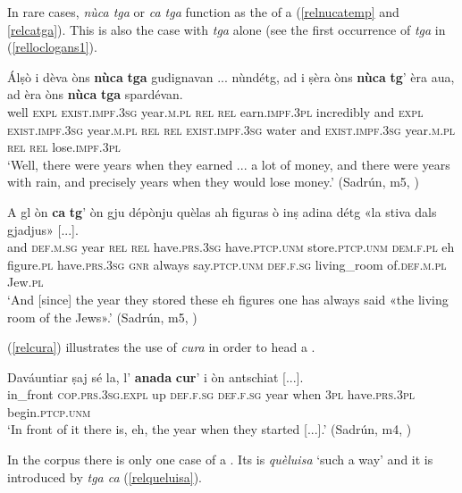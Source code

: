 In rare cases, \textit{nùca tga} or \textit{ca tga} function as the  of a  (\ref{relnucatemp} and \ref{relcatga}). This is also the case with \textit{tga} alone (see the first occurrence of \textit{tga} in (\ref{relloclogans1}).

\ea
\label{relnucatemp}
\gll Álṣò i dèva òns \textbf{nùca} \textbf{tga} gudignavan ... nùndétg, ad i ṣèra òns \textbf{nùca} \textbf{tg}’ èra aua, ad èra òns \textbf{nùca} \textbf{tga} spardévan.\\
well \textsc{expl} \textsc{exist.impf.3sg} year.\textsc{m.pl} \textsc{rel} \textsc{rel} earn.\textsc{impf.3pl} {} incredibly and \textsc{expl} \textsc{exist.impf.3sg} year.\textsc{m.pl} \textsc{rel} \textsc{rel} \textsc{exist.impf.3sg} water and \textsc{exist.impf.3sg} year.\textsc{m.pl} \textsc{rel} \textsc{rel} lose.\textsc{impf.3pl} \\
\glt `Well, there were years when they earned ... a lot of money, and there were years with rain, and precisely years when they would lose money.' (Sadrún, m5, )
\z

\ea
\label{relcatga}
\gll A gl òn \textbf{ca} \textbf{tg}’ òn gju dépònju quèlas ah figuras ò inṣ adina détg «la stiva dals gjadjus» [...].\\
and \textsc{def.m.sg} year \textsc{rel} \textsc{rel} have.\textsc{prs.3sg} have.\textsc{ptcp.unm} store.\textsc{ptcp.unm} \textsc{dem.f.pl} eh figure.\textsc{pl} have.\textsc{prs.3sg} \textsc{gnr} always say.\textsc{ptcp.unm} \textsc{def.f.sg} living\_room of.\textsc{def.m.pl} Jew.\textsc{pl}\\
\glt `And [since] the year they stored these eh figures one has always said «the living room of the Jews».' (Sadrún, m5, )
\z

(\ref{relcura}) illustrates the use of \textit{cura} in order to head a .

\ea
\label{relcura}
\gll Daváuntiar ṣaj sé la, l’ \textbf{anada} \textbf{cur}' i òn antschiat [...].\\
in\_front  \textsc{cop.prs.3sg.expl} up \textsc{def.f.sg} \textsc{def.f.sg} year when \textsc{3pl} have.\textsc{prs.3pl} begin.\textsc{ptcp.unm}\\
\glt `In front of it there is, eh, the year when they started [...].' (Sadrún, m4, )
\z

In the corpus there is only one case of a . Its  is \textit{quèluisa} `such a way' and it is introduced by \textit{tga ca} (\ref{relqueluisa}).

